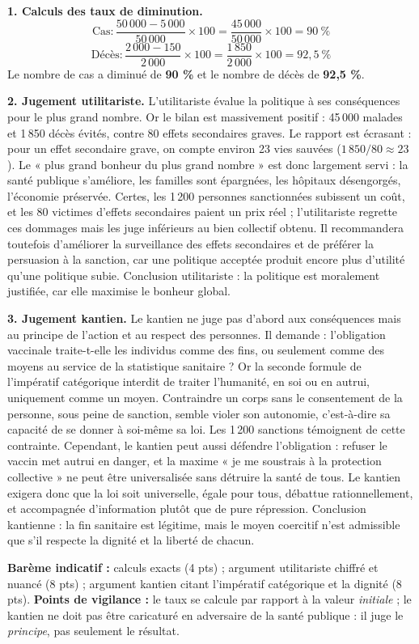 \documentclass[11pt]{article}
\begin{document}
\begin{corrige}
\textbf{1. Calculs des taux de diminution.}
\[ \text{Cas} : \frac{50\,000 - 5\,000}{50\,000}\times 100 = \frac{45\,000}{50\,000}\times 100 = 90\ \% \]
\[ \text{Décès} : \frac{2\,000 - 150}{2\,000}\times 100 = \frac{1\,850}{2\,000}\times 100 = 92{,}5\ \% \]
Le nombre de cas a diminué de \textbf{90 \%} et le nombre de décès de \textbf{92,5 \%}.

\textbf{2. Jugement utilitariste.} L'utilitariste évalue la politique à ses conséquences pour le plus grand nombre. Or le bilan est massivement positif : 45\,000 malades et 1\,850 décès évités, contre 80 effets secondaires graves. Le rapport est écrasant : pour un effet secondaire grave, on compte environ 23 vies sauvées ($1\,850/80 \approx 23$). Le « plus grand bonheur du plus grand nombre » est donc largement servi : la santé publique s'améliore, les familles sont épargnées, les hôpitaux désengorgés, l'économie préservée. Certes, les 1\,200 personnes sanctionnées subissent un coût, et les 80 victimes d'effets secondaires paient un prix réel ; l'utilitariste regrette ces dommages mais les juge inférieurs au bien collectif obtenu. Il recommandera toutefois d'améliorer la surveillance des effets secondaires et de préférer la persuasion à la sanction, car une politique acceptée produit encore plus d'utilité qu'une politique subie. Conclusion utilitariste : la politique est moralement justifiée, car elle maximise le bonheur global.

\textbf{3. Jugement kantien.} Le kantien ne juge pas d'abord aux conséquences mais au principe de l'action et au respect des personnes. Il demande : l'obligation vaccinale traite-t-elle les individus comme des fins, ou seulement comme des moyens au service de la statistique sanitaire ? Or la seconde formule de l'impératif catégorique interdit de traiter l'humanité, en soi ou en autrui, uniquement comme un moyen. Contraindre un corps sans le consentement de la personne, sous peine de sanction, semble violer son autonomie, c'est-à-dire sa capacité de se donner à soi-même sa loi. Les 1\,200 sanctions témoignent de cette contrainte. Cependant, le kantien peut aussi défendre l'obligation : refuser le vaccin met autrui en danger, et la maxime « je me soustrais à la protection collective » ne peut être universalisée sans détruire la santé de tous. Le kantien exigera donc que la loi soit universelle, égale pour tous, débattue rationnellement, et accompagnée d'information plutôt que de pure répression. Conclusion kantienne : la fin sanitaire est légitime, mais le moyen coercitif n'est admissible que s'il respecte la dignité et la liberté de chacun.

\textbf{Barème indicatif :} calculs exacts (4 pts) ; argument utilitariste chiffré et nuancé (8 pts) ; argument kantien citant l'impératif catégorique et la dignité (8 pts).
\textbf{Points de vigilance :} le taux se calcule par rapport à la valeur \emph{initiale} ; le kantien ne doit pas être caricaturé en adversaire de la santé publique : il juge le \emph{principe}, pas seulement le résultat.
\end{corrige}
\end{document}
